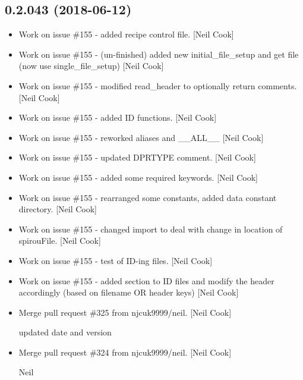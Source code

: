 \documentclass[a4paper,10pt,english]{report}
\begin{document}
\subsection{0.2.043 (2018-06-12)}
\label{\detokenize{misc/changelog:id421}}\begin{itemize}
\item {} 
Work on issue \#155 - added recipe control file. {[}Neil Cook{]}

\item {} 
Work on issue \#155 - (un-finished) added new initial\_file\_setup and
get file (now use single\_file\_setup) {[}Neil Cook{]}

\item {} 
Work on issue \#155 - modified read\_header to optionally return
comments. {[}Neil Cook{]}

\item {} 
Work on issue \#155 - added ID functions. {[}Neil Cook{]}

\item {} 
Work on issue \#155 - reworked aliases and \_\_ALL\_\_ {[}Neil Cook{]}

\item {} 
Work on issue \#155 - updated DPRTYPE comment. {[}Neil Cook{]}

\item {} 
Work on issue \#155 - added some required keywords. {[}Neil Cook{]}

\item {} 
Work on issue \#155 - rearranged some constants, added data constant
directory. {[}Neil Cook{]}

\item {} 
Work on issue \#155 - changed import to deal with change in location of
spirouFile. {[}Neil Cook{]}

\item {} 
Work on issue \#155 - test of ID-ing files. {[}Neil Cook{]}

\item {} 
Work on issue \#155 - added section to ID files and modify the header
accordingly (based on filename OR header keys) {[}Neil Cook{]}

\item {} 
Merge pull request \#325 from njcuk9999/neil. {[}Neil Cook{]}

updated date and version

\item {} 
Merge pull request \#324 from njcuk9999/neil. {[}Neil Cook{]}

Neil

\end{itemize}
\end{document}
